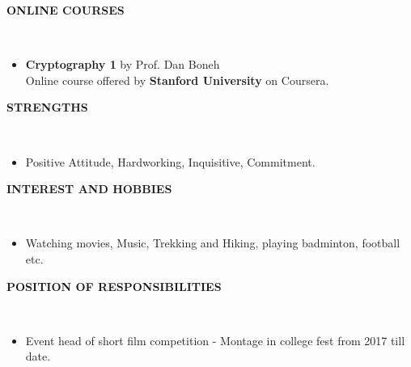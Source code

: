 \documentclass[a4paper,10pt]{article}
\newcommand{\lsep}{-0.5cm}
\newcommand{\resheading}[1]{{\small \colorbox{mygrey}{\begin{minipage}{0.975\textwidth}{\textbf{#1 \vphantom{p\^{E}}}}\end{minipage}}}}
\begin{document}
\resheading{\textbf{ONLINE COURSES} }\\[\lsep]
\begin{itemize}
\item \textbf{Cryptography 1 } 
by Prof. Dan Boneh\\
Online course offered by \textbf{Stanford University} on Coursera. 
\end{itemize}

\resheading{\textbf{STRENGTHS} }\\[\lsep]
\begin{itemize}
\item \noindent Positive Attitude, Hardworking, Inquisitive, Commitment.
\end{itemize}

\resheading{\textbf{INTEREST AND HOBBIES} }\\[\lsep]
\begin{itemize}
\item \noindent Watching movies, Music, Trekking and Hiking, playing badminton, football etc.
\end{itemize}

\resheading{\textbf{POSITION OF RESPONSIBILITIES} }\\[\lsep]
\begin{itemize}
\item \noindent Event head of short film competition - Montage in college fest from 2017 till date.
\end{itemize}
\end{document}
